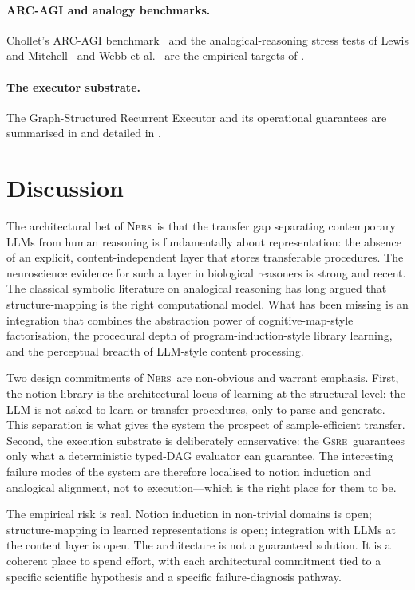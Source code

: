 \documentclass[11pt,a4paper]{article}
\theoremstyle{plain}
\theoremstyle{definition}
\theoremstyle{remark}
\newcommand{\GSRE}{\textsc{Gsre}}
\newcommand{\NBRS}{\textsc{Nbrs}}
\begin{document}
\paragraph{ARC-AGI and analogy benchmarks.}
Chollet's ARC-AGI benchmark~\cite{chollet2019arc, chollet2024onthemeasureofintelligence} and the analogical-reasoning stress tests of Lewis and Mitchell~\cite{lewis2024analogy} and Webb et al.~\cite{webb2023emergent} are the empirical targets of .

\paragraph{The executor substrate.}
The Graph-Structured Recurrent Executor and its operational guarantees are summarised in  and detailed in .

\section{Discussion}
\label{sec:discussion}

The architectural bet of \NBRS\ is that the transfer gap separating contemporary LLMs from human reasoning is fundamentally about representation: the absence of an explicit, content-independent layer that stores transferable procedures. The neuroscience evidence for such a layer in biological reasoners is strong and recent. The classical symbolic literature on analogical reasoning has long argued that structure-mapping is the right computational model. What has been missing is an integration that combines the abstraction power of cognitive-map-style factorisation, the procedural depth of program-induction-style library learning, and the perceptual breadth of LLM-style content processing.

Two design commitments of \NBRS\ are non-obvious and warrant emphasis. First, the notion library is the architectural locus of learning at the structural level: the LLM is not asked to learn or transfer procedures, only to parse and generate. This separation is what gives the system the prospect of sample-efficient transfer. Second, the execution substrate is deliberately conservative: the \GSRE\ guarantees only what a deterministic typed-DAG evaluator can guarantee. The interesting failure modes of the system are therefore localised to notion induction and analogical alignment, not to execution---which is the right place for them to be.

The empirical risk is real. Notion induction in non-trivial domains is open; structure-mapping in learned representations is open; integration with LLMs at the content layer is open. The architecture is not a guaranteed solution. It is a coherent place to spend effort, with each architectural commitment tied to a specific scientific hypothesis and a specific failure-diagnosis pathway.
\end{document}
